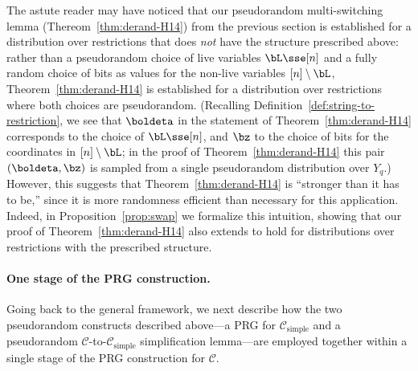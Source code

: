 \documentclass[11pt]{article}
\numberwithin{equation}{section}
\theoremstyle{definition}
\theoremstyle{plain}
\theoremstyle{plain}
\newcommand{\simple}{\mathrm{simple}}
\begin{document}
 The astute reader may have noticed that our pseudorandom multi-switching lemma (Thereom~\ref{thm:derand-H14}) from the previous section is established for a distribution over restrictions that does \emph{not} have the structure prescribed above: rather than a pseudorandom choice of live variables $\bL \sse [n]$ and a fully random choice of bits as values for the non-live variables ${[n] \setminus \bL}$, Theorem~\ref{thm:derand-H14} is established for a distribution over restrictions where both choices are pseudorandom. (Recalling Definition~\ref{def:string-to-restriction}, we see that $\boldeta$ in the statement of Theorem~\ref{thm:derand-H14} corresponds to the choice of $\bL \sse [n]$, and $\bz$ to the choice of bits for the coordinates in $[n] \setminus \bL$; in the proof of Theorem~\ref{thm:derand-H14} this pair $(\boldeta,\bz)$ is sampled from a single pseudorandom distribution over $Y_q$.)  However, this suggests that Theorem~\ref{thm:derand-H14} is ``stronger than it has to be,'' since it is more randomness efficient than necessary for this application. Indeed, in Proposition~\ref{prop:swap} we formalize this intuition, showing that our proof of Theorem~\ref{thm:derand-H14} also extends to hold for distributions over restrictions with the prescribed structure.


\vspace{-5pt}

\paragraph{One stage of the PRG construction.}  Going back to the general framework, we next describe how the two pseudorandom constructs described above---a PRG for $\mathscr{C}_\simple$ and a pseudorandom $\mathscr{C}$-to-$\mathscr{C}_\simple$ simplification lemma---are employed together within a single stage of the PRG construction for $\mathscr{C}$. 
\end{document}
